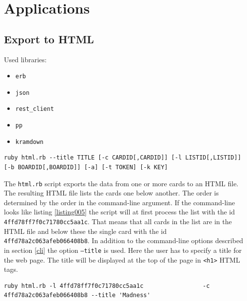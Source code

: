 \onehalfspacing
\chapter{Applications}

\section{Export to HTML}\label{html.rb}

Used libraries:
\begin{itemize}
	\item \texttt{erb}
	\item \texttt{json}
	\item \texttt{rest\_client}
	\item \texttt{pp}
	\item \texttt{kramdown}
\end{itemize}

\begin{lstlisting}[aboveskip=1\baselineskip, style=bash, caption=\texttt{html.rb} usage., label=listing026]
ruby html.rb --title TITLE [-c CARDID[,CARDID]] [-l LISTID[,LISTID]] [-b BOARDID[,BOARDID]] [-a] [-t TOKEN] [-k KEY]
\end{lstlisting}

The \texttt{html.rb} script exports the data from one or more cards to an HTML file. The resulting HTML file lists the cards one below another. The order is determined by the order in the command-line argument. If the command-line looks like listing \ref{listing005} the script will at first process the list with the id \texttt{4ffd78ff7f0c71780cc5aa1c}. That means that all cards in the list are in the HTML file and below these the single card with the id \texttt{4ffd78a2c063afeb066408b8}. In addition to the command-line options described in section \ref{cli} the option \texttt{--title} is used. Here the user has to specify a title for the web page. The title will be displayed at the top of the page in \lstinline{<h1>} HTML tags.

\begin{lstlisting}[aboveskip=1\baselineskip, style=bash, caption=Example of a \texttt{html.rb} call., label=listing005]
ruby html.rb -l 4ffd78ff7f0c71780cc5aa1c                 -c 4ffd78a2c063afeb066408b8 --title 'Madness'
\end{lstlisting} 

